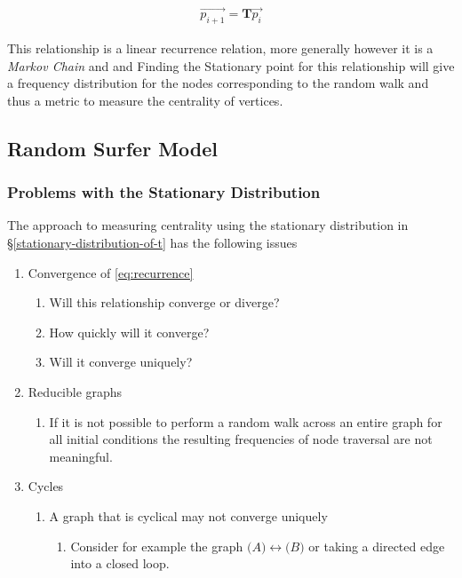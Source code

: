 \documentclass[11pt]{report}
\begin{document}
\begin{align}
\vec{p_{i+1}} = \mathbf{T}\vec{p_{i}} \label{eq:recurrence}
\end{align}

This relationship is a linear recurrence relation, more generally however it is
a \emph{Markov Chain} and \cite[\S 4.4]{langvilleGooglePageRankScience2012} and
Finding the Stationary point for this relationship will give a frequency
distribution for the nodes corresponding to the random walk and thus a metric to
measure the centrality of vertices.

\subsection{Random Surfer Model}
\label{sec:org046df67}
\subsubsection{Problems with the Stationary Distribution}
\label{issues}
The approach to measuring centrality using the stationary distribution in \S\ref{stationary-distribution-of-t} has the following issues

\begin{enumerate}
\item Convergence of \eqref{eq:recurrence}
\begin{enumerate}
\item Will this relationship converge or diverge?
\item How quickly will it converge?
\item Will it converge uniquely?
\end{enumerate}
\item Reducible graphs
\begin{enumerate}
\item If it is not possible to perform a random walk across an entire graph for
all initial conditions the resulting frequencies of node traversal are not
meaningful.
\end{enumerate}
\item Cycles
\begin{enumerate}
\item A graph that is cyclical may not converge uniquely
\begin{enumerate}
\item Consider for example the graph \({\big (} A {\big )} \longleftrightarrow {\big (} B {\big )}\) or taking a directed edge into a closed loop.
\end{enumerate}
\end{enumerate}
\end{enumerate}
\end{document}
